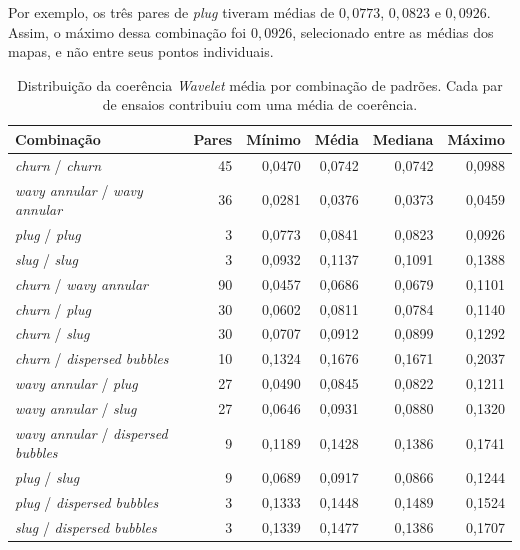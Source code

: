 Por exemplo, os três pares de \textit{plug} tiveram médias de $0{,}0773$,
$0{,}0823$ e $0{,}0926$. Assim, o máximo dessa combinação foi $0{,}0926$,
selecionado entre as médias dos mapas, e não entre seus pontos individuais.

\begin{table}[!htbp]
  \centering
  \begin{threeparttable}
  \caption[Distribuição da coerência \textit{Wavelet} média por combinação de padrões.]{Distribuição
  da coerência \textit{Wavelet} média por combinação de padrões. Cada par de ensaios
  contribuiu com uma média de coerência.}
  \label{tab:res-wco-combinacoes}
  \small
  \begin{tabular*}{\textwidth}{@{\extracolsep{\fill}}l r r r r r@{}}
    \hline
    \textbf{Combinação} & \textbf{Pares} & \textbf{Mínimo} &
    \textbf{Média} & \textbf{Mediana} & \textbf{Máximo}\\
    \hline
    \textit{churn} / \textit{churn} & 45 & 0,0470 & 0,0742 & 0,0742 & 0,0988\\
    \textit{wavy annular} / \textit{wavy annular} & 36 & 0,0281 & 0,0376 & 0,0373 & 0,0459\\
    \textit{plug} / \textit{plug} & 3 & 0,0773 & 0,0841 & 0,0823 & 0,0926\\
    \textit{slug} / \textit{slug} & 3 & 0,0932 & 0,1137 & 0,1091 & 0,1388\\
    \hline
    \textit{churn} / \textit{wavy annular} & 90 & 0,0457 & 0,0686 & 0,0679 & 0,1101\\
    \textit{churn} / \textit{plug} & 30 & 0,0602 & 0,0811 & 0,0784 & 0,1140\\
    \textit{churn} / \textit{slug} & 30 & 0,0707 & 0,0912 & 0,0899 & 0,1292\\
    \textit{churn} / \textit{dispersed bubbles} & 10 & 0,1324 & 0,1676 & 0,1671 & 0,2037\\
    \textit{wavy annular} / \textit{plug} & 27 & 0,0490 & 0,0845 & 0,0822 & 0,1211\\
    \textit{wavy annular} / \textit{slug} & 27 & 0,0646 & 0,0931 & 0,0880 & 0,1320\\
    \textit{wavy annular} / \textit{dispersed bubbles} & 9 & 0,1189 & 0,1428 & 0,1386 & 0,1741\\
    \textit{plug} / \textit{slug} & 9 & 0,0689 & 0,0917 & 0,0866 & 0,1244\\
    \textit{plug} / \textit{dispersed bubbles} & 3 & 0,1333 & 0,1448 & 0,1489 & 0,1524\\
    \textit{slug} / \textit{dispersed bubbles} & 3 & 0,1339 & 0,1477 & 0,1386 & 0,1707\\
    \hline
  \end{tabular*}
  \end{threeparttable}
\end{table}

